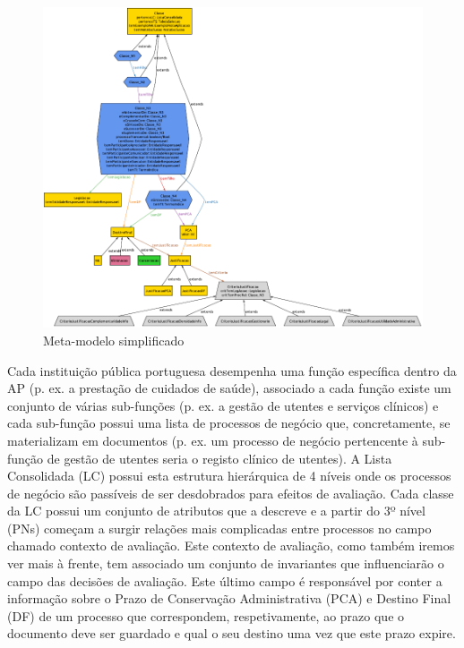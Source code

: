 \documentclass[tikz,runningheads,a4paper]{llncs}
\begin{document}
\begin{figure}[H]
\centering
\includegraphics[width=\linewidth]{metamodel.pdf}
\caption{Meta-modelo simplificado}
\label{metamodel}
\end{figure}

Cada instituição pública portuguesa desempenha uma função específica dentro da AP (p. ex. a prestação de cuidados de saúde), associado a cada função existe um conjunto de várias sub-funções (p. ex. a gestão de utentes e serviços clínicos) e cada sub-função possui uma lista de processos de negócio que, concretamente, se materializam em documentos (p. ex. um processo de negócio pertencente à sub-função de gestão de utentes seria o registo clínico de utentes). A Lista Consolidada (LC) possui esta estrutura hierárquica de 4 níveis\cite{clav-mod} onde os processos de negócio são passíveis de ser desdobrados para efeitos de avaliação. Cada classe da LC possui um conjunto de atributos que a descreve e a partir do 3º nível (PNs) começam a surgir relações mais complicadas entre processos no campo chamado contexto de avaliação. Este contexto de avaliação, como também iremos ver mais à frente, tem associado um conjunto de invariantes que influenciarão o campo das decisões de avaliação. Este último campo é responsável por conter a informação sobre o Prazo de Conservação Administrativa (PCA) e Destino Final (DF) de um processo que correspondem, respetivamente, ao prazo que o documento deve ser guardado e qual o seu destino uma vez que este prazo expire.
\end{document}
